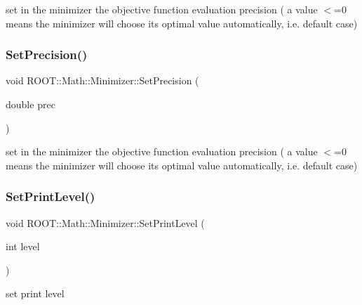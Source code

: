 set in the minimizer the objective function evaluation precision ( a value $<$=0 means the minimizer will choose its optimal value automatically, i.\+e. default case) \mbox{\label{classROOT_1_1Math_1_1Minimizer_a96160fe12f3cddf6ca0668ddb4a585bc}} 
\subsubsection{\texorpdfstring{SetPrecision()}{SetPrecision()}\hspace{0.1cm}{\footnotesize\ttfamily [3/3]}}
{\footnotesize\ttfamily void R\+O\+O\+T\+::\+Math\+::\+Minimizer\+::\+Set\+Precision (\begin{DoxyParamCaption}\item[{double}]{prec }\end{DoxyParamCaption})\hspace{0.3cm}{\ttfamily [inline]}}

set in the minimizer the objective function evaluation precision ( a value $<$=0 means the minimizer will choose its optimal value automatically, i.\+e. default case) \mbox{\label{classROOT_1_1Math_1_1Minimizer_a726ee3c159360784a2d76f0b9e9594a6}} 
\subsubsection{\texorpdfstring{SetPrintLevel()}{SetPrintLevel()}\hspace{0.1cm}{\footnotesize\ttfamily [1/3]}}
{\footnotesize\ttfamily void R\+O\+O\+T\+::\+Math\+::\+Minimizer\+::\+Set\+Print\+Level (\begin{DoxyParamCaption}\item[{int}]{level }\end{DoxyParamCaption})\hspace{0.3cm}{\ttfamily [inline]}}



set print level 

\mbox{\label{classROOT_1_1Math_1_1Minimizer_a726ee3c159360784a2d76f0b9e9594a6}} 
